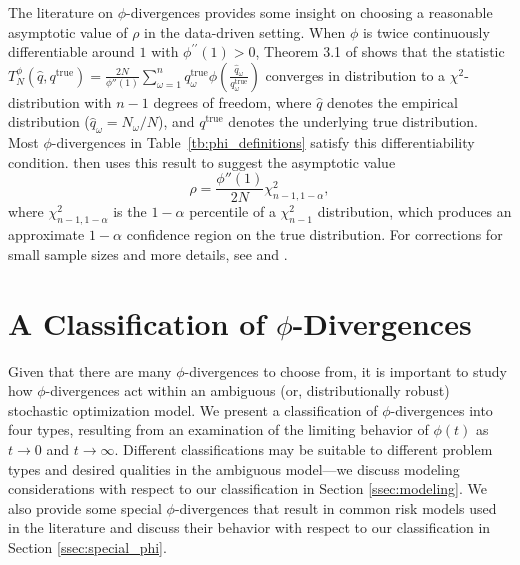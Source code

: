 \documentclass[ijoc,letterpaper]{informs3} %
\newcommand{\qtrue}{q^{\text{true}}}
\begin{document}
The literature on $\phi$-divergences provides some insight on choosing a reasonable asymptotic value of $\rho$ in the data-driven setting. 
When $\phi$ is twice continuously differentiable around $1$ with $\phi^{\prime \prime}(1)>0$, Theorem 3.1 of \cite{pardo2005statistical} shows that the statistic $T^\phi_N(\hat{q},\qtrue) = \frac{2N}{\phi''(1)} \sum_{\omega=1}^n \qtrue_\omega \phi\left(\frac{\hat{q}_\omega}{\qtrue_\omega}\right)$ converges in distribution to a $\chi^2$-distribution with $n-1$ degrees of freedom, where $\hat{q}$ denotes the empirical distribution ($\hat{q}_\omega = N_\omega/N$), and $\qtrue$ denotes the underlying true distribution.
Most $\phi$-divergences in Table~\ref{tb:phi_definitions} satisfy this differentiability condition.
\cite{bental2011robust} then uses this result to suggest the asymptotic value
\begin{equation} \label{eq:asymptotic_rho}
	\rho = \frac{\phi''(1)}{2N} \chi^2_{n-1,1-\alpha},
\end{equation}
where $\chi^2_{n-1,1-\alpha}$ is the $1-\alpha$ percentile of a $\chi^2_{n-1}$ distribution, which produces an approximate $1-\alpha$ confidence region on the true distribution.
For corrections for small sample sizes and more details, see \citep{pardo2005statistical} and \citep{bental2011robust}.

\section{A Classification of $\phi$-Divergences}
\label{sec:classification}

Given that there are many $\phi$-divergences to choose from, it is important to study how $\phi$-divergences act within an ambiguous (or, distributionally robust) stochastic optimization model. 
We present a classification of $\phi$-divergences into four types, resulting from an examination of the limiting behavior of $\phi(t)$ as $t \rightarrow 0$ and $t \rightarrow \infty$.
Different classifications may be suitable to different problem types and desired qualities in the ambiguous model---we discuss modeling considerations with respect to our classification in Section \ref{ssec:modeling}.
We also provide some special $\phi$-divergences that result in common risk models used in the literature and discuss their behavior with respect to our classification in Section \ref{ssec:special_phi}.

\end{document}
